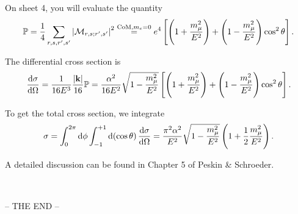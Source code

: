 \documentclass[a4paper,11pt]{article}
\begin{document}
	On sheet 4, you will evaluate the quantity
	\[
		\mathbb{P} = \frac{1}{4} \sum _{r,s,r',s'} \abs{\mathcal{M}_{r,s;r',s'}}^2 \overset{\text{CoM,} m_e = 0}{=} e^4 \left[ \left( 1 + \frac{m_\mu^2}{E^2} \right) + \left( 1 - \frac{m_\mu^2}{E^2} \right) \cos^2\theta \right].
	\]

	The differential cross section is
	\[
		\dv{\sigma}{\Omega} = \frac{1}{16 E^3} \frac{\abs{\vb k}}{16} \mathbb{P} = \frac{\alpha^2}{16E^2} \sqrt{1 - \frac{m_\mu^2}{E^2}}\left[ \left( 1 + \frac{m_\mu^2}{E^2} \right) + \left( 1 - \frac{m_\mu^2}{E^2} \right) \cos^2\theta \right].
	\]
	
	To get the total cross section, we integrate 
	\[
		\sigma = \int_{0}^{2 \pi} \dd{\phi} \int_{-1}^{+1} \dd{(\cos \theta)} \dv{\sigma}{\Omega} = \frac{\pi^2 \alpha^2}{E^2} \sqrt{1 - \frac{m_\mu^2}{E^2}} \left( 1 + \frac{1}{2} \frac{m_\mu^2}{E^2} \right).
	\]
	
	A detailed discussion can be found in Chapter 5 of Peskin \& Schroeder.

	\ 

	\begin{center}
		-- THE END --
	\end{center}
	
\end{document}

